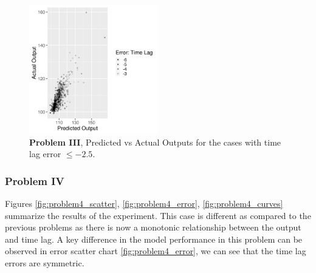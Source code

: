 \documentclass[runningheads]{llncs}
\begin{document}
\begin{figure}[h]
\vspace{.3in}
\centerline{\includegraphics[width=0.5\textwidth]{figures/exp3_lag_error_jus.png}}
\vspace{.3in}
\caption{\textbf{Problem III}, Predicted vs Actual Outputs for the cases with time lag error $\leq -2.5$.}
\label{fig:problem3_lag_error_jus}
\end{figure}





\subsubsection{Problem IV}

Figures \ref{fig:problem4_scatter}, \ref{fig:problem4_error}, \ref{fig:problem4_curves} summarize 
the results of the experiment. This case is different as compared to the previous problems as there 
is now a monotonic relationship between the output and time lag. A key difference in the model 
performance in this problem can be observed in error scatter chart \ref{fig:problem4_error}, 
we can see that the time lag errors are symmetric.
\end{document}
